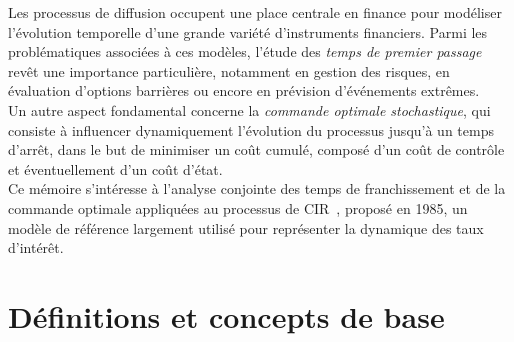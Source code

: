 \label{sec:Introduction}  %
Les processus de diffusion occupent une place centrale en finance pour modéliser l'évolution temporelle d'une grande variété d'instruments financiers. Parmi les problématiques associées à ces modèles, l'étude des \textit{temps de premier passage} revêt une importance particulière, notamment en gestion des risques, en évaluation d'options barrières ou encore en prévision d'événements extrêmes.\\
Un autre aspect fondamental concerne la \textit{commande optimale stochastique}, qui consiste à influencer dynamiquement l'évolution du processus jusqu'à un temps d'arrêt, dans le but de minimiser un coût cumulé, composé d'un coût de contrôle et éventuellement d'un coût d'état.\\
Ce mémoire s'intéresse à l'analyse conjointe des temps de franchissement et de la commande optimale appliquées au processus de \acl{CIR}~\cite{cox1985}, proposé en 1985, un modèle de référence largement utilisé pour représenter la dynamique des taux d'intérêt.
 
\section{Définitions et concepts de base}  %

